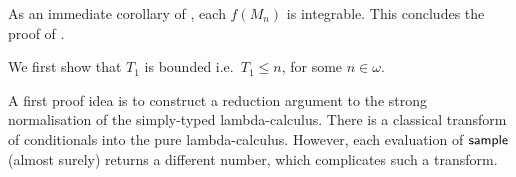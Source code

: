 As an immediate corollary of , each $f(M_n)$ is integrable.
This concludes the proof of . 

\medskip

\newcommand\transform[1]{{\ulcorner{#1}\urcorner}}

\iffalse
As before, fix a $M \in \Lambda^0$.
Recall the random variables on $(S, \calF, \mu)$:
\begin{align*}
T_0(s) & := 0 \\
T_{n+1}(s) & := \min \{ k \mid k>T_n(s), M_k(s) \textrm{ a value or of form } E[\tY \lambda x. N] \}
\end{align*}
\fi

\TnBounded*

We first show that $T_1$ is bounded i.e.~$T_1 \leq n$, for some $n \in \omega$.

A first proof idea is to construct a reduction argument to the strong normalisation of the simply-typed lambda-calculus.
 There is a classical transform of conditionals into the pure lambda-calculus.
However, each evaluation of $\mathsf{sample}$ (almost surely) returns a different number, which complicates such a transform.

